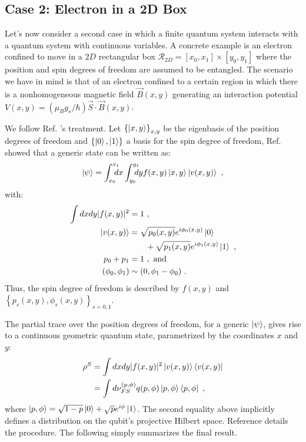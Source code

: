 \documentclass[draft,nofootinbib,pre,twocolumn,showkeys,superscriptaddress,preprintnumbers,floatfix]{revtex4-1}
\newcommand{\1}{\mathbbm{1}}
\begin{document}
\subsection{Case 2: Electron in a 2D Box}
\label{sec:Example2}

Let's now consider a second case in which a finite quantum system interacts
with a quantum system with continuous variables. A concrete example is an
electron confined to move in a $2D$ rectangular box $\mathcal{R}_{2D} =
[x_0,x_1] \times [y_0,y_1]$ where the position and spin degrees of freedom are
assumed to be entangled. The scenario we have in mind is that of an electron
confined to a certain region in which there is a nonhomogeneous magnetic field
$\vec{B}(x,y)$ generating an interaction potential $V(x,y) = (\mu_B g_s /
\hbar) \vec{S} \cdot \vec{B}(x,y)$.

We follow Ref. \cite{Anza20a}'s treatment. Let $\left\{\ket{x,y}\right\}_{x,y}$
be the eigenbasis of the position degrees of freedom and $\left\{
\ket{0},\ket{1}\right\}$ a basis for the spin degree of freedom, Ref.
\cite{Anza20a} showed that a generic state can be written as:
\begin{align*}
\ket{\psi} = \int_{x_0}^{x_1} \!\!\!\!\! dx \int_{y_0}^{y_1} \!\!\!\!\! dy f(x,y) \ket{x,y} \ket{v(x,y)}
  ~,
\end{align*}
with:
\begin{align*}
\int dx dy \vert f(x,y) \vert^2 & = 1 ~, \\
\ket{v(x,y)} & = \sqrt{p_0(x,y)}e^{i\phi_0(x,y)}\ket{0} \\
  & \qquad + \sqrt{p_1(x,y)}e^{i\phi_1(x,y)}\ket{1} ~,\\
p_0 + p_1 & = 1 ~, ~\text{and} \\
(\phi_0,\phi_1)  & \sim (0,\phi_1-\phi_0)
  ~.
\end{align*}
Thus, the spin degree of freedom is described by $f(x,y)$ and $\left\{p_s(x,y),
\phi_s(x,y)\right\}_{s=0,1}$.

The partial trace over the position degrees of freedom, for a generic
$\ket{\psi}$, gives rise to a continuous geometric quantum state, parametrized
by the coordinates $x$ and $y$:
\begin{align*}
\rho^S &= \int dx dy |f(x,y)|^2 \ket{v(x,y)}\bra{v(x,y)}\\
& = \int d\nu_{FS}^{(p,\phi)} q(p,\phi) \ket{p,\phi}\bra{p,\phi}
  ~,
\end{align*}
where $\ket{p,\phi}= \sqrt{1-p}\ket{0}+\sqrt{p}e^{i\phi}\ket{1}$. The second
equality above implicitly defines a distribution on the qubit's projective
Hilbert space. Reference \cite{Anza20a} details the procedure. The following
simply summarizes the final result.
\end{document}
